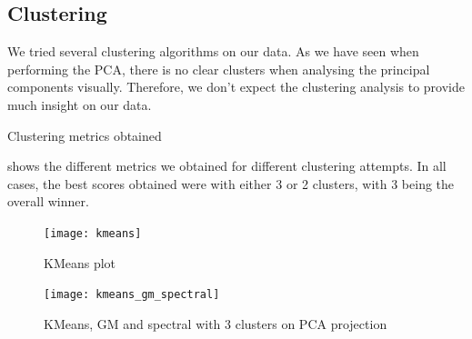 \subsection{Clustering}%
\label{sub:clustering}

We tried several clustering algorithms on our data. As we have seen when performing the PCA, there is
no clear clusters when analysing the principal components visually. Therefore, we don't expect the
clustering analysis to provide much insight on our data.

\begin{table}[htp]
\caption{Clustering metrics obtained}%
\label{tab:clustering_metrics}

\end{table}

 shows the different metrics we obtained for different clustering
attempts. In all cases, the best scores obtained were with either 3 or 2 clusters, with
3 being the overall winner.


\begin{figure}[H]
  \texttt{[image: kmeans]}
  \caption{KMeans plot}%
  \label{fig:kmeans-3}
\end{figure}

\begin{figure}[H]
  \texttt{[image: kmeans\_gm\_spectral]}
  \caption{KMeans, GM and spectral with 3 clusters on PCA projection}%
  \label{fig:kmeans-gm}
\end{figure}